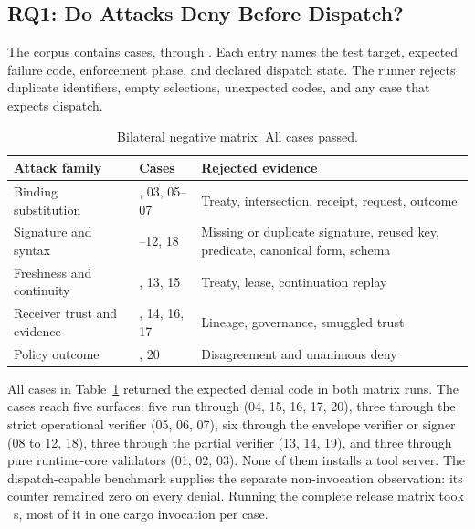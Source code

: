 \subsection{RQ1: Do Attacks Deny Before Dispatch?}

The corpus contains \PSThreatCaseCount{} cases,
 through . Each entry names the test
target, expected failure code, enforcement phase, and declared dispatch state.
The runner rejects duplicate identifiers, empty selections, unexpected codes,
and any case that expects dispatch.

\begin{table}[t]
\caption{Bilateral negative matrix. All \PSThreatCaseCount{} cases passed.}
\label{tab:threat-matrix}
\scriptsize
\begin{tabularx}{\columnwidth}{@{}>{\raggedright\arraybackslash}p{}>{\raggedright\arraybackslash}p{}>{\raggedright\arraybackslash}X@{}}
\toprule
Attack family & Cases & Rejected evidence \\
\midrule
Binding substitution
& 01, 03, 05--07
& Treaty, intersection, receipt, request, outcome \\
Signature and syntax
& 08--12, 18
& Missing or duplicate signature, reused key, predicate, canonical form, schema \\
Freshness and continuity
& 02, 13, 15
& Treaty, lease, continuation replay \\
Receiver trust and evidence
& 04, 14, 16, 17
& Lineage, governance, smuggled trust \\
Policy outcome
& 19, 20
& Disagreement and unanimous deny \\
\bottomrule
\end{tabularx}
\end{table}

All \PSThreatCaseCount{} cases in Table~\ref{tab:threat-matrix} returned the
expected denial code in both matrix runs. The cases reach five surfaces: five
run through  (04, 15, 16, 17,
20), three through the strict operational verifier
 (05, 06, 07), six through the
envelope verifier or signer (08 to 12, 18), three through the partial verifier
 (13, 14, 19), and three through
pure runtime-core validators (01, 02, 03). None of them installs a tool
server. The dispatch-capable benchmark supplies the separate non-invocation
observation: its counter remained zero on every denial. Running the complete
release matrix took \PSNegativeMatrixSeconds~s, most of it in one cargo
invocation per case.

